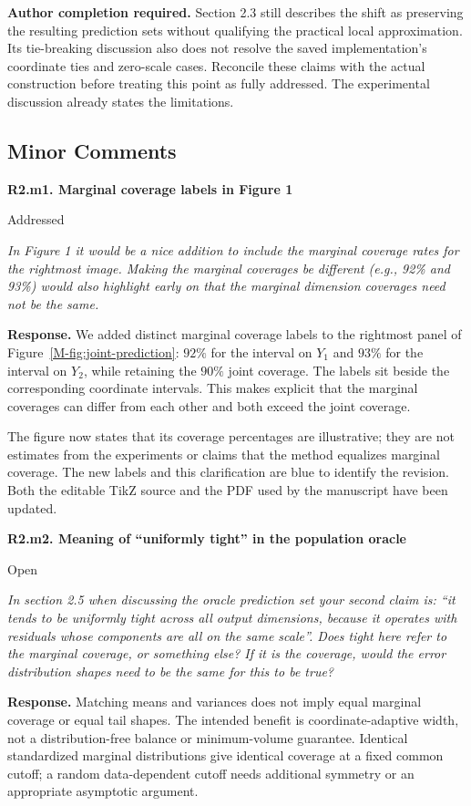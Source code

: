 \documentclass[11pt]{article}
\newcommand{\msfig}[1]{Figure~\ref*{M-#1}}
\newcommand{\action}[1]{\par{\small\color{ActionRed}\textbf{Author completion required.} #1\par}}
\newcommand{\point}[3]{\par\Needspace{7\baselineskip}\medskip
\noindent\parbox[t]{0.77\linewidth}{\textbf{#1}}\hfill
\parbox[t]{0.21\linewidth}{\raggedleft\small\sffamily #2}\par\nopagebreak
{\color{ReviewerBlue}\small\itshape #3\par}\textbf{Response.} }
\begin{document}
\action{Section 2.3 still describes the shift as preserving the resulting prediction sets without qualifying the practical local approximation. Its tie-breaking discussion also does not resolve the saved implementation's coordinate ties and zero-scale cases. Reconcile these claims with the actual construction before treating this point as fully addressed. The experimental discussion already states the limitations.}

\subsection*{Minor Comments}

\point{R2.m1. Marginal coverage labels in Figure 1}{Addressed}{In Figure 1 it would be a nice addition to include the marginal
coverage rates for the rightmost image. Making the marginal
coverages be different (e.g., 92\% and 93\%) would also highlight
early on that the marginal dimension coverages need not be the same.}
\label{response:R2.m1}
We added distinct marginal coverage labels to the rightmost panel of \msfig{fig:joint-prediction}: $92\%$ for the interval on $Y_1$ and $93\%$ for the interval on $Y_2$, while retaining the $90\%$ joint coverage. The labels sit beside the corresponding coordinate intervals. This makes explicit that the marginal coverages can differ from each other and both exceed the joint coverage.

The figure now states that its coverage percentages are illustrative; they are not estimates from the experiments or claims that the method equalizes marginal coverage. The new labels and this clarification are blue to identify the revision. Both the editable TikZ source and the PDF used by the manuscript have been updated.

\point{R2.m2. Meaning of ``uniformly tight'' in the population oracle}{Open}{In section 2.5 when discussing the oracle prediction set your
second claim is: ``it tends to be uniformly tight across all
output dimensions, because it operates with residuals whose
components are all on the same scale''. Does tight here refer
to the marginal coverage, or something else? If it is the
coverage, would the error distribution shapes need to be the
same for this to be true?}
\label{response:R2.m2}
Matching means and variances does not imply equal marginal coverage or equal tail shapes. The intended benefit is coordinate-adaptive width, not a distribution-free balance or minimum-volume guarantee. Identical standardized marginal distributions give identical coverage at a fixed common cutoff; a random data-dependent cutoff needs additional symmetry or an appropriate asymptotic argument.
\end{document}
